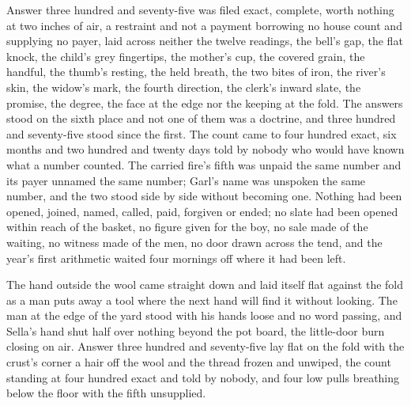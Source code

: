 Answer three hundred and seventy-five was filed exact, complete, worth nothing at two inches of air, a restraint and not a payment borrowing no house count and supplying no payer, laid across neither the twelve readings, the bell's gap, the flat knock, the child's grey fingertips, the mother's cup, the covered grain, the handful, the thumb's resting, the held breath, the two bites of iron, the river's skin, the widow's mark, the fourth direction, the clerk's inward slate, the promise, the degree, the face at the edge nor the keeping at the fold. The answers stood on the sixth place and not one of them was a doctrine, and three hundred and seventy-five stood since the first. The count came to four hundred exact, six months and two hundred and twenty days told by nobody who would have known what a number counted. The carried fire's fifth was unpaid the same number and its payer unnamed the same number; Garl's name was unspoken the same number, and the two stood side by side without becoming one. Nothing had been opened, joined, named, called, paid, forgiven or ended; no slate had been opened within reach of the basket, no figure given for the boy, no sale made of the waiting, no witness made of the men, no door drawn across the tend, and the year's first arithmetic waited four mornings off where it had been left.

The hand outside the wool came straight down and laid itself flat against the fold as a man puts away a tool where the next hand will find it without looking. The man at the edge of the yard stood with his hands loose and no word passing, and Sella's hand shut half over nothing beyond the pot board, the little-door burn closing on air. Answer three hundred and seventy-five lay flat on the fold with the crust's corner a hair off the wool and the thread frozen and unwiped, the count standing at four hundred exact and told by nobody, and four low pulls breathing below the floor with the fifth unsupplied.
